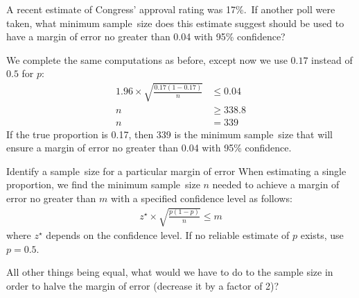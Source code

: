 \begin{examplewrap}
\begin{nexample}
{A recent estimate of Congress' approval rating was 17\%.\footnotemark\, If another poll were taken, what minimum sample~size does this estimate suggest should be used to have a margin of error no greater than 0.04 with 95\% confidence?}

We complete the same computations as before, except now we use $0.17$ instead of $0.5$ for $p$:
\begin{align*}
1.96\times \sqrt{\frac{0.17(1-0.17)}{n}} &\leq 0.04\\
n &\geq 338.8\\
n &= 339
\end{align*}
If the true proportion is 0.17, then 339 is the minimum sample~size that will ensure a margin of error no greater than 0.04 with 95\% confidence.


\end{nexample}
\end{examplewrap}

\begin{onebox}{Identify a sample~size for a particular margin of error}
When estimating a single proportion, we find the minimum sample~size $n$ needed to achieve a margin of error no greater than $m$ with a specified confidence level as follows:
\begin{align*}
z^{\star}\times \sqrt{\frac{p(1-p)}{n}} \leq m
\end{align*}
where $z^{\star}$ depends on the confidence level.   If no reliable estimate of $p$ exists, use $p = 0.5$.  	
\end{onebox}

\begin{exercisewrap}
\begin{nexercise}All other things being equal, what would we have to do to the sample size in order to halve the margin of error (decrease it by a factor of 2)?\footnotemark
\end{nexercise}
\end{exercisewrap}

